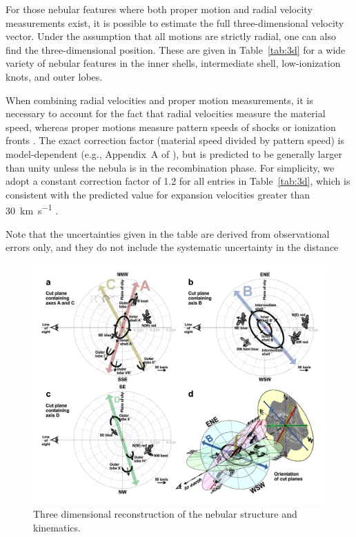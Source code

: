 \documentclass[useAMS, usenatbib]{mnras}
\begin{document}
For those nebular features where both proper motion and radial velocity measurements exist,
it is possible to estimate the full three-dimensional velocity vector.
Under the assumption that all motions are strictly radial,
one can also find the three-dimensional position.
These are given in Table~\ref{tab:3d} for a wide variety of nebular features
in the inner shells, intermediate shell, low-ionization knots, and outer lobes.

When combining radial velocities and proper motion measurements,
it is necessary to account for the fact that radial velocities measure the material speed,
whereas proper motions measure pattern speeds of shocks or ionization fronts \citep{Mellema:2004a}. 
The exact correction factor (material speed divided by pattern speed)
is model-dependent (e.g., Appendix~A of \citealp{ODell:2009c}),
but is predicted to be generally larger than unity
\citetext{see Fig.~8 of \citealp{Jacob:2013a}}
unless the nebula is in the recombination phase.
For simplicity, we adopt a constant correction factor of 1.2 for all entries in Table~\ref{tab:3d},
which is consistent with the predicted value for expansion velocities greater than \SI{30}{km.s^{-1}}
\citetext{see Fig.~5 of \citealp{Schonberner:2018a}}.

Note that the uncertainties given in the table are derived from observational errors only,
and they do not include the systematic uncertainty in the distance

\begin{figure}
  \includegraphics[width=\linewidth]
  {figs/cut-axis-4panel}
  \caption{Three dimensional reconstruction of the nebular structure and kinematics. }
  \label{fig:cut-axis-3d}
\end{figure}
\end{document}
